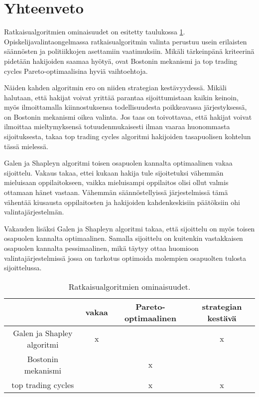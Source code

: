 \documentclass[gradu, twoside]{tktltiki}
\begin{document}
\section{Yhteenveto}

Ratkaisualgoritmien ominaisuudet on esitetty
taulukossa \ref{algoritmi_ominaisuudet}. Opiskelijavalintaongelmassa
ratkaisualgoritmin valinta perustuu usein erilaisten säännösten ja
politiikkojen asettamiin vaatimuksiin. Mikäli tärkeinpänä kriteerinä
pidetään hakijoiden saamaa hyötyä, ovat Bostonin mekanismi ja top
trading cycles Pareto-optimaalisina hyviä vaihtoehtoja.

Näiden kahden algoritmin ero on niiden strategian kestävyydessä.
Mikäli halutaan, että hakijat voivat yrittää parantaa sijoittumistaan
kaikin keinoin, myös ilmoittamalla kiinnostuksensa todellisuudesta
poikkeavassa järjestyksessä, on Bostonin mekanismi oikea valinta. Jos
taas on toivottavaa, että hakijat voivat ilmoittaa mieltymyksensä
totuudenmukaisesti ilman vaaraa huonommasta sijoituksesta, takaa top
trading cycles algoritmi hakijoiden tasapuolisen kohtelun tässä
mielessä.

Galen ja Shapleyn algoritmi toisen osapuolen kannalta optimaalinen
vakaa sijoittelu. Vakaus takaa, ettei kukaan hakija tule sijoitetuksi
vähemmän mieluisaan oppilaitokseen, vaikka mieluisampi oppilaitos
olisi ollut valmis ottamaan hänet vastaan. Vähemmän säännöstellyissä
järjestelmissä tämä vähentää kiusausta oppilaitosten ja hakijoiden
kahdenkeskisiin päätöksiin ohi valintajärjestelmän.

Vakauden lisäksi Galen ja Shapleyn algoritmi takaa, että sijoittelu on
myös toisen osapuolen kannalta optimaalinen. Samalla sijoittelu on
kuitenkin vastakkaisen osapuolen kannalta pessimaalinen, mikä täytyy
ottaa huomioon valintajärjestelmissä jossa on tarkotus optimoida
molempien osapuolten tulosta sijoittelussa.

\begin{table}[]
  \begin{center}
    \begin{tabular}{ c | c c c }
      & vakaa & Pareto-optimaalinen & strategian kestävä \\
      \hline
      Galen ja Shapley algoritmi & x &   & x \\
      Bostonin mekanismi         &   & x &   \\
      top trading cycles         &   & x & x \\
    \end{tabular}
    \caption{Ratkaisualgoritmien ominaisuudet.}
    \label{algoritmi_ominaisuudet}
  \end{center}
\end{table}
\end{document}
